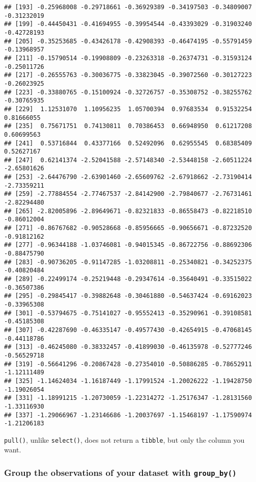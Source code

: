 \documentclass[
]{article}
\begin{document}
\begin{verbatim}
## [193] -0.25968008 -0.29718661 -0.36929389 -0.34197503 -0.34809007 -0.31232019
## [199] -0.44450431 -0.41694955 -0.39954544 -0.43393029 -0.31903240 -0.42728193
## [205] -0.35253685 -0.43426178 -0.42908393 -0.46474195 -0.55791459 -0.13968957
## [211] -0.15790514 -0.19908809 -0.23263318 -0.26374731 -0.31593124 -0.25011726
## [217] -0.26555763 -0.30036775 -0.33823045 -0.39072560 -0.30127223 -0.26023925
## [223] -0.33880765 -0.15100924 -0.32726757 -0.35308752 -0.38255762 -0.30765935
## [229]  1.12531070  1.10956235  1.05700394  0.97683534  0.91532254  0.81666055
## [235]  0.75671751  0.74130811  0.70386453  0.66948950  0.61217208  0.60699563
## [241]  0.53716844  0.43377166  0.52492096  0.62955545  0.68385409  0.52627167
## [247]  0.62141374 -2.52041588 -2.57148340 -2.53448158 -2.60511224 -2.65801626
## [253] -2.64476790 -2.63901460 -2.65609762 -2.67918662 -2.73190414 -2.73359211
## [259] -2.77884554 -2.77467537 -2.84142900 -2.79840677 -2.76731461 -2.82294480
## [265] -2.82005896 -2.89649671 -0.82321833 -0.86558473 -0.82218510 -0.86012004
## [271] -0.86767682 -0.90528668 -0.85956665 -0.90656671 -0.87232520 -0.91812162
## [277] -0.96344188 -1.03746081 -0.94015345 -0.86722756 -0.88692306 -0.88475790
## [283] -0.90736205 -0.91147285 -1.03208811 -0.25340821 -0.34252375 -0.40820484
## [289] -0.22499174 -0.25219448 -0.29347614 -0.35640491 -0.33515022 -0.36507386
## [295] -0.29845417 -0.39882648 -0.30461880 -0.54637424 -0.69162023 -0.33965308
## [301] -0.53794675 -0.75141027 -0.95552413 -0.35290961 -0.39108581 -0.45185308
## [307] -0.42287690 -0.46335147 -0.49577430 -0.42654915 -0.47068145 -0.44118786
## [313] -0.46245080 -0.38332457 -0.41899030 -0.46135978 -0.52777246 -0.56529718
## [319] -0.56641296 -0.20867428 -0.27354010 -0.50886285 -0.78652911 -1.12111489
## [325] -1.14624034 -1.16187449 -1.17991524 -1.20026222 -1.19428750 -1.19026054
## [331] -1.18991215 -1.20730059 -1.22314272 -1.25176347 -1.28131560 -1.33116930
## [337] -1.29066967 -1.23146686 -1.20037697 -1.15468197 -1.17590974 -1.21206183
\end{verbatim}

\texttt{pull()}, unlike \texttt{select()}, does not return a \texttt{tibble}, but only the column you want.

\hypertarget{group-the-observations-of-your-dataset-with-group_by}{%
\subsubsection{\texorpdfstring{Group the observations of your dataset with \texttt{group\_by()}}{Group the observations of your dataset with group\_by()}}\label{group-the-observations-of-your-dataset-with-group_by}}
\end{document}
